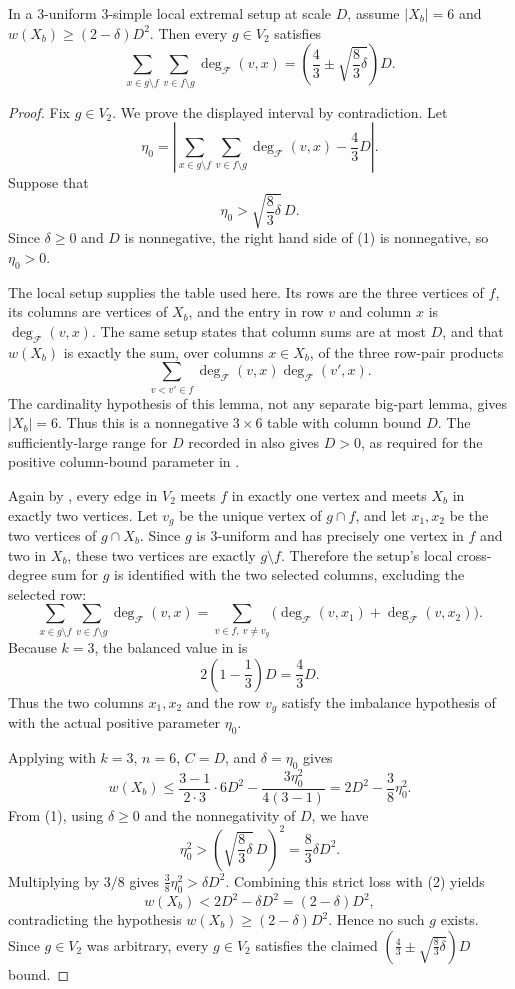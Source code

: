 \begin{lemma}
In a $3$-uniform $3$-simple local extremal setup at scale $D$, assume
$|X_b|=6$ and $w(X_b)\ge(2-\delta)D^2$.  Then every $g\in V_2$ satisfies
\[
\sum_{x\in g\setminus f}\sum_{v\in f\setminus g}
\deg_{\mathcal F}(v,x)
=\left(\frac43\pm\sqrt{\frac83\delta}\right)D .
\]
\end{lemma}
\begin{proof}
Fix $g\in V_2$.  We prove the displayed interval by contradiction.  Let
\[
\eta_0=
\left|
\sum_{x\in g\setminus f}\sum_{v\in f\setminus g}\deg_{\mathcal F}(v,x)
-\frac43D
\right|.
\]
Suppose that
\[
\eta_0>\sqrt{\frac83\delta}\,D. \tag{1}
\]
Since $\delta\ge0$ and $D$ is nonnegative, the right hand side of (1) is
nonnegative, so $\eta_0>0$.

The local setup  supplies the
table used here.  Its rows are the three vertices of $f$, its columns are
vertices of $X_b$, and the entry in row $v$ and column $x$ is
$\deg_{\mathcal F}(v,x)$.  The same setup states that column sums are at most
$D$, and that $w(X_b)$ is exactly the sum, over columns $x\in X_b$, of the
three row-pair products
\[
\sum_{v<v'\in f}\deg_{\mathcal F}(v,x)\deg_{\mathcal F}(v',x).
\]
The cardinality hypothesis of this lemma, not any separate big-part lemma,
gives $|X_b|=6$.  Thus this is a nonnegative $3\times6$ table with column
bound $D$.  The sufficiently-large range for $D$ recorded in
 also gives $D>0$, as required for
the positive column-bound parameter in .

Again by , every edge in $V_2$
meets $f$ in exactly one vertex and meets $X_b$ in exactly two vertices.  Let
$v_g$ be the unique vertex of $g\cap f$, and let $x_1,x_2$ be the two
vertices of $g\cap X_b$.  Since $g$ is $3$-uniform and has precisely one
vertex in $f$ and two in $X_b$, these two vertices are exactly
$g\setminus f$.  Therefore the setup's local cross-degree sum for $g$ is
identified with the two selected columns, excluding the selected row:
\[
\sum_{x\in g\setminus f}\sum_{v\in f\setminus g}\deg_{\mathcal F}(v,x)
=\sum_{v\in f,\ v\ne v_g}
\bigl(\deg_{\mathcal F}(v,x_1)+\deg_{\mathcal F}(v,x_2)\bigr).
\]
Because $k=3$, the balanced value in  is
\[
2\left(1-\frac13\right)D=\frac43D.
\]
Thus the two columns $x_1,x_2$ and the row $v_g$ satisfy the imbalance
hypothesis of  with the actual positive parameter
$\eta_0$.

Applying  with $k=3$, $n=6$, $C=D$, and
$\delta=\eta_0$ gives
\[
w(X_b)\le
\frac{3-1}{2\cdot3}\cdot6D^2-\frac{3\eta_0^2}{4(3-1)}
=2D^2-\frac38\eta_0^2. \tag{2}
\]
From (1), using $\delta\ge0$ and the nonnegativity of $D$, we have
\[
\eta_0^2>\left(\sqrt{\frac83\delta}\,D\right)^2
=\frac83\delta D^2.
\]
Multiplying by $3/8$ gives $\frac38\eta_0^2>\delta D^2$.  Combining this
strict loss with (2) yields
\[
w(X_b)<2D^2-\delta D^2=(2-\delta)D^2,
\]
contradicting the hypothesis $w(X_b)\ge(2-\delta)D^2$.  Hence no such $g$
exists.  Since $g\in V_2$ was arbitrary, every $g\in V_2$ satisfies the
claimed $\left(\frac43\pm\sqrt{\frac83\delta}\right)D$ bound.
\end{proof}
